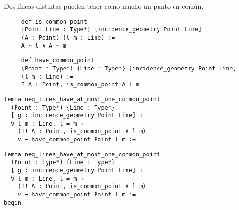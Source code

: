 \begin{frame}[fragile]
	\begin{prop}
		Dos líneas distintas pueden tener como mucho un punto en común.
	\end{prop}
	\vspace{1em}
	\pause

	\begin{lstlisting}
     def is_common_point 
     {Point Line : Type*} [incidence_geometry Point Line] 
     (A : Point) (l m : Line) := 
     A ~ l ∧ A ~ m 
	\end{lstlisting}

	\begin{lstlisting}
     def have_common_point 
     (Point : Type*) {Line : Type*} [incidence_geometry Point Line]
     (l m : Line) := 
     ∃ A : Point, is_common_point A l m
	\end{lstlisting}
\end{frame}










\begin{frame}[fragile]
	\begin{multicols}{2}
		\begin{lstlisting}
lemma neq_lines_have_at_most_one_common_point 
  (Point : Type*) {Line : Type*} 
  [ig : incidence_geometry Point Line] :
  ∀ l m : Line, l ≠ m → 
    (∃! A : Point, is_common_point A l m) 
    ∨ ¬ have_common_point Point l m := 
\end{lstlisting}
		\columnbreak
		\hfill
	\end{multicols}
\end{frame}










\begin{frame}[fragile]
	\begin{multicols}{2}
		\begin{lstlisting}
lemma neq_lines_have_at_most_one_common_point 
  (Point : Type*) {Line : Type*} 
  [ig : incidence_geometry Point Line] :
  ∀ l m : Line, l ≠ m → 
    (∃! A : Point, is_common_point A l m) 
    ∨ ¬ have_common_point Point l m := 
begin
\end{lstlisting}
		\columnbreak
		\begin{lstlisting}

		\end{lstlisting}
	\end{multicols}
\end{frame}










